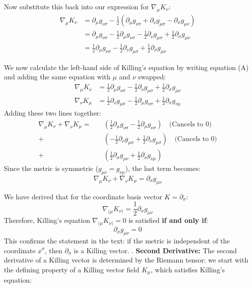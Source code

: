 \documentclass[11pt, a4paper]{report}
\begin{document}
Now substitute this back into our expression for $\nabla_\mu K_\nu$:
\begin{align*}
    \nabla_\mu K_\nu &= \partial_\mu g_{\nu\sigma} - \frac{1}{2} (\partial_\mu g_{\nu\sigma} + \partial_\nu g_{\mu\sigma} - \partial_\sigma g_{\mu\nu}) \\
    &= \partial_\mu g_{\nu\sigma} - \frac{1}{2} \partial_\mu g_{\nu\sigma} - \frac{1}{2} \partial_\nu g_{\mu\sigma} + \frac{1}{2} \partial_\sigma g_{\mu\nu} \\
    &= \frac{1}{2} \partial_\mu g_{\nu\sigma} - \frac{1}{2} \partial_\nu g_{\mu\sigma} + \frac{1}{2} \partial_\sigma g_{\mu\nu} \tag{A}
\end{align*}

We now calculate the left-hand side of Killing's equation by writing equation (A) and adding the same equation with $\mu$ and $\nu$ swapped:
\begin{align*}
    \nabla_\mu K_\nu &= \frac{1}{2} \partial_\mu g_{\nu\sigma} - \frac{1}{2} \partial_\nu g_{\mu\sigma} + \frac{1}{2} \partial_\sigma g_{\mu\nu} \\
    \nabla_\nu K_\mu &= \frac{1}{2} \partial_\nu g_{\mu\sigma} - \frac{1}{2} \partial_\mu g_{\nu\sigma} + \frac{1}{2} \partial_\sigma g_{\nu\mu}
\end{align*}
Adding these two lines together:
\begin{align*}
    \nabla_\mu K_\nu + \nabla_\nu K_\mu = \quad & \left( \frac{1}{2} \partial_\mu g_{\nu\sigma} - \frac{1}{2} \partial_\mu g_{\nu\sigma} \right) \quad \text{(Cancels to 0)} \\
    + & \left( - \frac{1}{2} \partial_\nu g_{\mu\sigma} + \frac{1}{2} \partial_\nu g_{\mu\sigma} \right) \quad \text{(Cancels to 0)} \\
    + & \left( \frac{1}{2} \partial_\sigma g_{\mu\nu} + \frac{1}{2} \partial_\sigma g_{\nu\mu} \right)
\end{align*}
Since the metric is symmetric ($g_{\mu\nu} = g_{\nu\mu}$), the last term becomes:
\begin{equation}
    \nabla_\mu K_\nu + \nabla_\nu K_\mu = \partial_\sigma g_{\mu\nu}
\end{equation}

We have derived that for the coordinate basis vector $K = \partial_\sigma$:
\begin{equation}
    \nabla_{(\mu} K_{\nu)} = \frac{1}{2} \partial_\sigma g_{\mu\nu}
\end{equation}
Therefore, Killing's equation $\nabla_{(\mu} K_{\nu)} = 0$ is satisfied \textbf{if and only if}:
\begin{equation}
    \partial_\sigma g_{\mu\nu} = 0
\end{equation}
This confirms the statement in the text: if the metric is independent of the coordinate $x^\sigma$, then $\partial_\sigma$ is a Killing vector.
.  \textbf{Second Derivative:} The second derivative of a Killing vector is determined by the Riemann tensor:
    we start with the defining property of a Killing vector field $K_{\mu}$, which satisfies Killing's equation:
\end{document}
